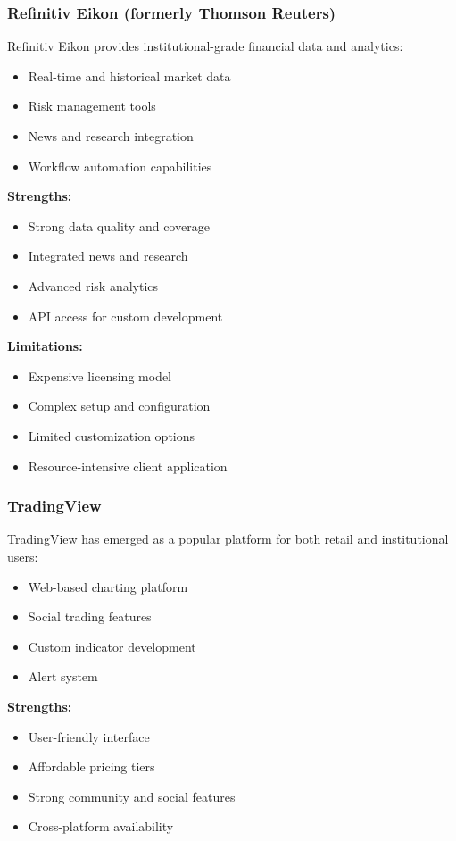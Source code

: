 \subsubsection{Refinitiv Eikon (formerly Thomson Reuters)}

Refinitiv Eikon provides institutional-grade financial data and analytics:
\begin{itemize}
    \item Real-time and historical market data
    \item Risk management tools
    \item News and research integration
    \item Workflow automation capabilities
\end{itemize}

\textbf{Strengths:}
\begin{itemize}
    \item Strong data quality and coverage
    \item Integrated news and research
    \item Advanced risk analytics
    \item API access for custom development
\end{itemize}

\textbf{Limitations:}
\begin{itemize}
    \item Expensive licensing model
    \item Complex setup and configuration
    \item Limited customization options
    \item Resource-intensive client application
\end{itemize}

\subsubsection{TradingView}

TradingView has emerged as a popular platform for both retail and institutional users:
\begin{itemize}
    \item Web-based charting platform
    \item Social trading features
    \item Custom indicator development
    \item Alert system
\end{itemize}

\textbf{Strengths:}
\begin{itemize}
    \item User-friendly interface
    \item Affordable pricing tiers
    \item Strong community and social features
    \item Cross-platform availability
\end{itemize}

